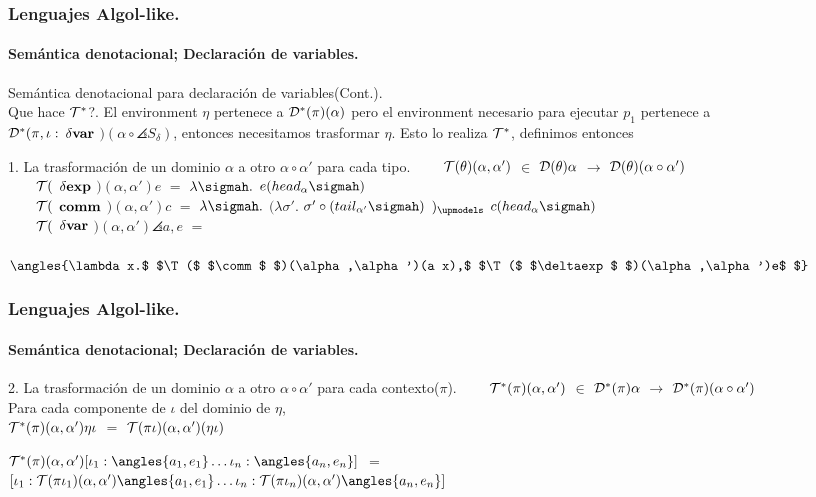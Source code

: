 \documentclass{beamer} %
\begin{document}
\begin{frame}[shrink=1]
\frametitle{Lenguajes Algol-like.}
\framesubtitle{Sem\'antica denotacional; Declaraci\'on de variables.}

\begin{block}{Sem\'antica denotacional para declaraci\'on de variables(Cont.). \\ Que hace $\mathcal{T}^{*}$?.}\small
El environment $\eta$ pertenece a $\mathcal{D}^{*}(\pi)(\alpha)$ pero el environment necesario para ejecutar $p_1$ pertenece a \\
$\mathcal{D}^{*}(\pi,\iota :$ $\delta \textbf{var}$ $)(\alpha \circ \angles{S_\delta})$, entonces necesitamos trasformar $\eta$.
Esto lo realiza $\mathcal{T}^{*}$, definimos entonces
\end{block}
\begin{block}{1. La trasformaci\'on de un dominio $\alpha$ a otro $\alpha \circ \alpha'$ para cada tipo.}
\ \ \ \ $\mathcal{T}(\theta)(\alpha,\alpha')$ $\in$ $\mathcal{D}(\theta)\alpha$ $\rightarrow$ $\mathcal{D}(\theta)(\alpha \circ \alpha')$\\



\ \ \ \ $\mathcal{T}($ $\delta \textbf{exp}$ $)(\alpha,\alpha')e$ $=$ $\lambda \sigmah .$ $e(head_{\alpha}\sigmah)$\\



\ \ \ \ $\mathcal{T}($ $\textbf{comm}$ $)(\alpha,\alpha')c$ $=$ 
$\lambda \sigmah .$ $(\lambda \sigma' .$ $\sigma' \circ (tail_{\alpha'}\sigmah)$ $)_{\upmodels}$ $c(head_{\alpha}\sigmah)$\\

\ \ \ \ $\mathcal{T}($ $\delta \textbf{var}$ $)(\alpha,\alpha')\angles{a,e}$ $=$ \\
\ \ \ \ \ \ \ \ \ \ \ \ $\angles{\lambda x.$ $\T($ $\comm$ $)(\alpha,\alpha')(a x),$ $\T($ $\deltaexp$ $)(\alpha,\alpha')e$ $}$
\end{block}
\end{frame}


\begin{frame}[shrink=1]
\frametitle{Lenguajes Algol-like.}
\framesubtitle{Sem\'antica denotacional; Declaraci\'on de variables.}

\begin{block}{2. La trasformaci\'on de un dominio $\alpha$ a otro $\alpha \circ \alpha'$ para cada contexto($\pi$).}
\ \ \ \ $\mathcal{T}^{*}(\pi)(\alpha,\alpha')$ $\in$ $\mathcal{D}^{*}(\pi)\alpha$ $\rightarrow$ $\mathcal{D}^{*}(\pi)(\alpha \circ \alpha')$\\

Para cada componente de $\iota$ del dominio de $\eta$, \\
$\mathcal{T}^{*}(\pi)(\alpha,\alpha')\eta\iota$ $=$ $\mathcal{T}(\pi\iota)(\alpha,\alpha')(\eta\iota)$ 
\end{block}

\begin{block}{}
$\T^{*}(\pi)(\alpha,\alpha')[\iota_1:\angles{a_1,e_1} \ldots \iota_n:\angles{a_n,e_n}]$ $=$ \\

$[\iota_1:\T(\pi\iota_1)(\alpha,\alpha')\angles{a_1,e_1} \ldots \iota_n:\T(\pi\iota_n)(\alpha,\alpha')\angles{a_n,e_n}]$
\end{block}

\end{frame}
\end{document}
